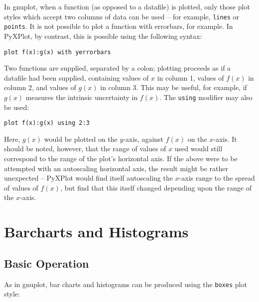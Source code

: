 In gnuplot, when a function (as opposed to a datafile) is plotted, only those
plot styles which accept two columns of data can be used -- for example,
\texttt{lines} or \texttt{points}. It is not possible to plot a function with
errorbars, for example. In PyXPlot, by contrast, this is possible using the
following syntax:

\begin{verbatim}
plot f(x):g(x) with yerrorbars
\end{verbatim}

Two functions are supplied, separated by a colon; plotting proceeds as if a
datafile had been supplied, containing values of $x$ in column 1, values of
$f(x)$ in column 2, and values of $g(x)$ in column 3. This may be useful, for
example, if $g(x)$ measures the intrinsic uncertainty in $f(x)$. The
\texttt{using} modifier may also be used:

\begin{verbatim}
plot f(x):g(x) using 2:3
\end{verbatim}

Here, $g(x)$ would be plotted on the $y$-axis, against $f(x)$ on the $x$-axis.
It should be noted, however, that the range of values of $x$ used would still
correspond to the range of the plot's horizontal axis. If the above were to be
attempted with an autoscaling horizontal axis, the result might be rather
unexpected -- PyXPlot would find itself autoscaling the $x$-axis range to the
spread of values of $f(x)$, but find that this itself changed depending upon
the range of the $x$-axis.

\section{Barcharts and Histograms}
\label{barcharts}

\subsection{Basic Operation}

As in gnuplot, bar charts and histograms can be produced using the
\texttt{boxes} plot style:


